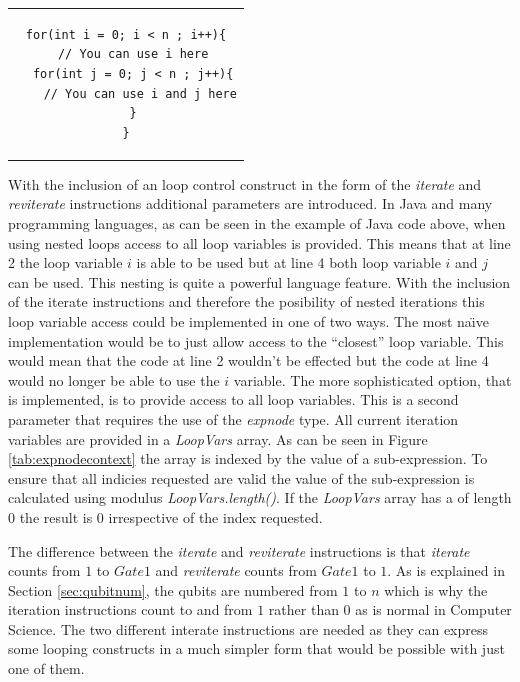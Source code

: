 \lstset{numbers=left,language=Java}
\begin{center}
\begin{tabular}{c}
\begin{lstlisting}
for(int i = 0; i < n ; i++){
  // You can use i here
  for(int j = 0; j < n ; j++){
    // You can use i and j here
  }
}
\end{lstlisting}
\end{tabular}
\end{center}

With the inclusion of an loop control construct in the form of the \emph{iterate} and \emph{reviterate} instructions additional parameters are introduced.
In Java and many programming languages, as can be seen in the example of Java code above, when using nested loops access to all loop variables is provided.
This means that at line 2 the loop variable $i$ is able to be used but at line 4 both loop variable $i$ and $j$ can be used.
This nesting is quite a powerful language feature.
With the inclusion of the iterate instructions and therefore the posibility of nested iterations this loop variable access could be implemented in one of two ways.
The most na\"{\i}ve implementation would be to just allow access to the ``closest'' loop variable.
This would mean that the code at line 2 wouldn't be effected but the code at line 4 would no longer be able to use the $i$ variable.
The more sophisticated option, that is implemented, is to provide access to all loop variables.
This is a second parameter that requires the use of the \emph{expnode} type.
All current iteration variables are provided in a \emph{LoopVars} array.
As can be seen in Figure \ref{tab:expnodecontext} the array is indexed by the value of a sub-expression.
To ensure that all indicies requested are valid the value of the sub-expression is calculated using modulus \emph{LoopVars.length()}.
If the \emph{LoopVars} array has a of length $0$ the result is $0$ irrespective of the index requested.

The difference between the \emph{iterate} and \emph{reviterate} instructions is that \emph{iterate} counts from $1$ to $Gate1$ and \emph{reviterate} counts from $Gate1$ to $1$.
As is explained in Section \ref{sec:qubitnum}, the qubits are numbered from $1$ to $n$ which is why the iteration instructions count to and from $1$ rather than $0$ as is normal in Computer Science.
The two different interate instructions are needed as they can express some looping constructs in a much simpler form that would be possible with just one of them.

